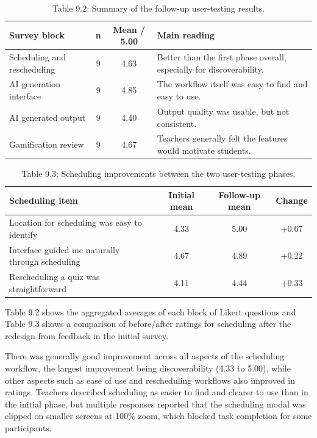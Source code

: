 \documentclass[
  12pt,
  a4paper,
]{report}
\begin{document}
\begin{table}[H]
\centering
\small
\begin{tabular}{@{}p{}c c p{}@{}}
\toprule
Survey block & n & Mean / 5.00 & Main reading \\
\midrule
Scheduling and rescheduling & 9 & 4.63 & Better than the first phase overall, especially for discoverability. \\
AI generation interface & 9 & 4.85 & The workflow itself was easy to find and easy to use. \\
AI generated output & 9 & 4.40 & Output quality was usable, but not consistent. \\
Gamification review & 9 & 4.67 & Teachers generally felt the features would motivate students. \\
\bottomrule
\end{tabular}
\caption*{Table 9.2: Summary of the follow-up user-testing results.}
\end{table}

\begin{table}[H]
\centering
\small
\begin{tabular}{@{}p{}c c c@{}}
\toprule
Scheduling item & Initial mean & Follow-up mean & Change \\
\midrule
Location for scheduling was easy to identify & 4.33 & 5.00 & +0.67 \\
Interface guided me naturally through scheduling & 4.67 & 4.89 & +0.22 \\
Rescheduling a quiz was straightforward & 4.11 & 4.44 & +0.33 \\
\bottomrule
\end{tabular}
\caption*{Table 9.3: Scheduling improvements between the two user-testing phases.}
\end{table}

Table 9.2 shows the aggregated averages of each block of Likert questions
and Table 9.3 shows a comparison of before/after ratings for scheduling after
the redesign from feedback in the initial survey.

There was generally good improvement across all aspects of the scheduling
workflow, the largest improvement being discoverability (4.33 to 5.00),
while other aspects such as ease of use and rescheduling workflows also
improved in ratings. Teachers described scheduling
as easier to find and clearer to use than in the initial phase, but
multiple responses reported that the scheduling modal was clipped on
smaller screens at 100\% zoom, which blocked task completion for some
participants.
\end{document}
